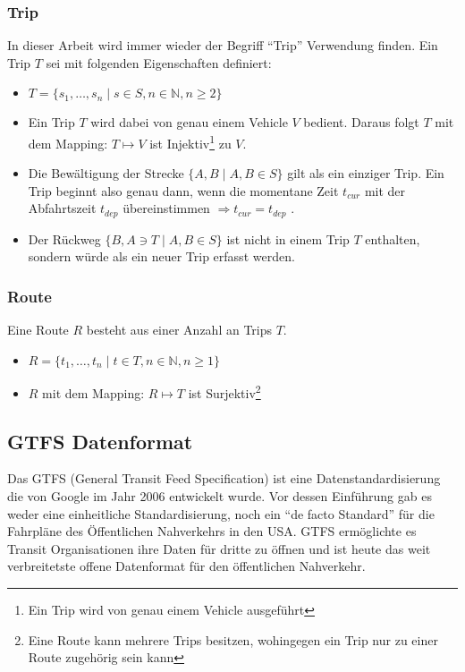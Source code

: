 \begin{newpage}
    \subsubsection{Trip}
    \label{ssub:trip}
      In dieser Arbeit wird immer wieder der Begriff "`Trip"' Verwendung finden. Ein Trip $T$ sei mit folgenden Eigenschaften definiert:
      \begin{itemize}
        \item $T = \{s_1, \dotsc, s_n \;|\; s \in S, n \in \mathbb{N}, n \geq 2 \}$

        \item Ein Trip $T$ wird dabei von genau einem Vehicle $V$ bedient. Daraus folgt $T$ mit dem Mapping: $T \mapsto V$ ist Injektiv\footnote{Ein Trip wird von genau einem Vehicle ausgeführt} zu $V$. 

        \item Die Bewältigung der Strecke $\{A,B \;|\; A, B \in S\}$ gilt als ein einziger Trip. Ein Trip beginnt also genau dann, wenn die momentane Zeit $t_{cur}$ mit der Abfahrtszeit $t_{dep}$ übereinstimmen $\Rightarrow t_{cur} = t_{dep} $ .

        \item Der Rückweg $\{B, A \ni T \;|\; A, B \in S\}$ ist nicht in einem Trip $T$ enthalten, sondern würde als ein neuer Trip erfasst werden.
      \end{itemize}
      

    \subsubsection{Route}
    \label{ssub:route}
      Eine Route $R$ besteht aus einer Anzahl an Trips $T$.
      \begin{itemize}
        \item $R = \{ t_1, \dotsc, t_n \;|\; t \in T, n \in \mathbb{N}, n \geq 1 \}$

        \item $R$ mit dem Mapping: $R \mapsto T$ ist Surjektiv\footnote{Eine Route kann mehrere Trips besitzen, wohingegen ein Trip nur zu einer Route zugehörig sein kann} 
      \end{itemize}


	\subsection{GTFS Datenformat}
	\label{ssec:gtfs_datenformat}
		Das GTFS (General Transit Feed Specification) ist eine Datenstandardisierung die von Google im Jahr 2006 entwickelt wurde. Vor dessen Einführung gab es weder eine einheitliche Standardisierung, noch ein "`de facto Standard"' für die Fahrpläne des Öffentlichen Nahverkehrs in den USA. GTFS ermöglichte es Transit Organisationen ihre Daten für dritte zu öffnen und ist heute das weit verbreitetste offene Datenformat für den öffentlichen Nahverkehr.\parencite[S. 2]{roush}\\


\end{newpage}
